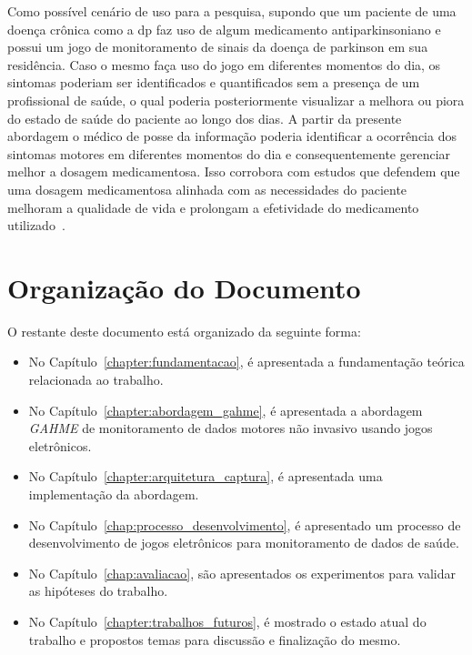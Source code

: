 Como possível cenário de uso para a pesquisa, supondo que um paciente de uma doença crônica como a \ac{dp} faz uso de algum medicamento antiparkinsoniano e possui um jogo de monitoramento de sinais da doença de parkinson em sua residência. Caso o mesmo faça uso do jogo em diferentes momentos do dia, os sintomas poderiam ser identificados e quantificados sem a presença de um profissional de saúde, o qual poderia posteriormente visualizar a melhora ou piora do estado de saúde do paciente ao longo dos dias. A partir da presente abordagem o médico de posse da informação poderia identificar a ocorrência dos sintomas motores em diferentes momentos do dia e consequentemente  gerenciar melhor a dosagem medicamentosa. Isso corrobora com estudos que defendem que uma dosagem medicamentosa alinhada com as necessidades do paciente melhoram a qualidade de vida e prolongam a efetividade do medicamento utilizado~\cite{rodrigues2006}.

\section{Organização do Documento}
O restante deste documento está organizado da seguinte forma:
\begin{itemize}
	\item No Capítulo~\ref{chapter:fundamentacao}, é apresentada a fundamentação teórica relacionada ao trabalho.
	\item No Capítulo~\ref{chapter:abordagem_gahme}, é apresentada a abordagem \textit{GAHME} de monitoramento de dados motores não invasivo usando jogos eletrônicos.
	\item No Capítulo~\ref{chapter:arquitetura_captura}, é apresentada uma implementação da abordagem.
	\item No Capítulo~\ref{chap:processo_desenvolvimento}, é apresentado um processo de desenvolvimento de jogos eletrônicos para monitoramento de dados de saúde.
	\item No Capítulo~\ref{chap:avaliacao}, são apresentados os experimentos para validar as hipóteses do trabalho.
	\item No Capítulo~\ref{chapter:trabalhos_futuros}, é mostrado o estado atual do trabalho e propostos temas para discussão e finalização do mesmo.
\end{itemize}
